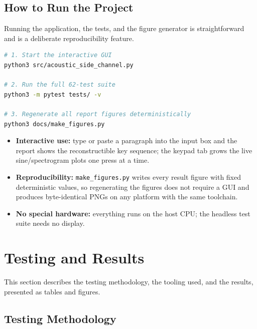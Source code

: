 \documentclass[11pt,a4paper]{article}
\begin{document}
\subsection{How to Run the Project}

Running the application, the tests, and the figure generator is
straightforward and is a deliberate reproducibility feature.

\begin{lstlisting}[language=bash, caption={Running the application, tests, and
    figure generator.}, label={lst:run}]
# 1. Start the interactive GUI
python3 src/acoustic_side_channel.py

# 2. Run the full 62-test suite
python3 -m pytest tests/ -v

# 3. Regenerate all report figures deterministically
python3 docs/make_figures.py
\end{lstlisting}

\begin{itemize}
    \item \textbf{Interactive use:} type or paste a paragraph into the input
          box and the report shows the reconstructible key sequence; the
          keypad tab grows the live sine/spectrogram plots one press at a
          time.
    \item \textbf{Reproducibility:} \texttt{make\_figures.py} writes every
          result figure with fixed deterministic values, so regenerating the
          figures does not require a GUI and produces byte-identical PNGs on
          any platform with the same toolchain.
    \item \textbf{No special hardware:} everything runs on the host CPU; the
          headless test suite needs no display.
\end{itemize}

\section{Testing and Results}
\label{sec:results}

This section describes the testing methodology, the tooling used, and the
results, presented as tables and figures.

\subsection{Testing Methodology}
\end{document}

